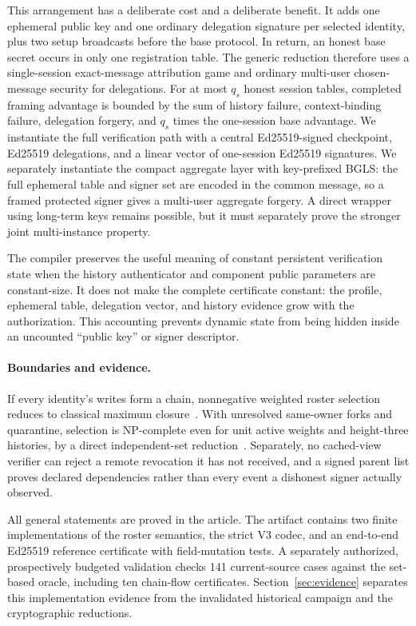 \documentclass[11pt]{article}
\theoremstyle{definition}
\begin{document}
This arrangement has a deliberate cost and a deliberate benefit.  It adds one ephemeral public key and one ordinary delegation signature per selected identity, plus two setup broadcasts before the base protocol.  In return, an honest base secret occurs in only one registration table.  The generic reduction therefore uses a single-session exact-message attribution game and ordinary multi-user chosen-message security for delegations.  For at most $q_s$ honest session tables, completed framing advantage is bounded by the sum of history failure, context-binding failure, delegation forgery, and $q_s$ times the one-session base advantage.  We instantiate the full verification path with a central Ed25519-signed checkpoint, Ed25519 delegations, and a linear vector of one-session Ed25519 signatures.  We separately instantiate the compact aggregate layer with key-prefixed BGLS: the full ephemeral table and signer set are encoded in the common message, so a framed protected signer gives a multi-user aggregate forgery.  A direct wrapper using long-term keys remains possible, but it must separately prove the stronger joint multi-instance property.

The compiler preserves the useful meaning of constant persistent verification state when the history authenticator and component public parameters are constant-size.  It does not make the complete certificate constant: the profile, ephemeral table, delegation vector, and history evidence grow with the authorization.  This accounting prevents dynamic state from being hidden inside an uncounted ``public key'' or signer descriptor.

\paragraph{Boundaries and evidence.}
If every identity's writes form a chain, nonnegative weighted roster selection reduces to classical maximum closure~\cite{picard1976closure}.  With unresolved same-owner forks and quarantine, selection is NP-complete even for unit active weights and height-three histories, by a direct independent-set reduction~\cite{karp1972reducibility}.  Separately, no cached-view verifier can reject a remote revocation it has not received, and a signed parent list proves declared dependencies rather than every event a dishonest signer actually observed.

All general statements are proved in the article. The artifact contains two finite implementations of the roster semantics, the strict V3 codec, and an end-to-end Ed25519 reference certificate with field-mutation tests. A separately authorized, prospectively budgeted validation checks 141 current-source cases against the set-based oracle, including ten chain-flow certificates. Section~\ref{sec:evidence} separates this implementation evidence from the invalidated historical campaign and the cryptographic reductions.
\end{document}
